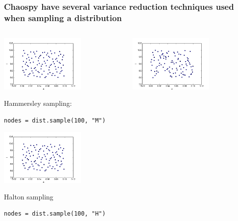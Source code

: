 \documentclass[presentation]{beamer}
\begin{document}
\begin{frame}[fragile]
 \frametitle{Chaospy have several variance reduction techniques used when sampling a distribution}
 \vspace{-2mm}
 \begin{columns}
     \begin{center}
                \includegraphics[width=0.65\textwidth]{samples_H.png}

                Hammersley sampling:

                \scriptsize
                \verb;nodes = dist.sample(100, "M");
                \normalsize

                \includegraphics[width=0.65\textwidth]{samples_H.png}

                Halton sampling

                \scriptsize
                \verb;nodes = dist.sample(100, "H");
                \normalsize

     \end{center}
     \begin{center}
                  \includegraphics[width=0.65\textwidth]{samples_L.png}


\end{center}
\end{columns}
\end{frame}
\end{document}

